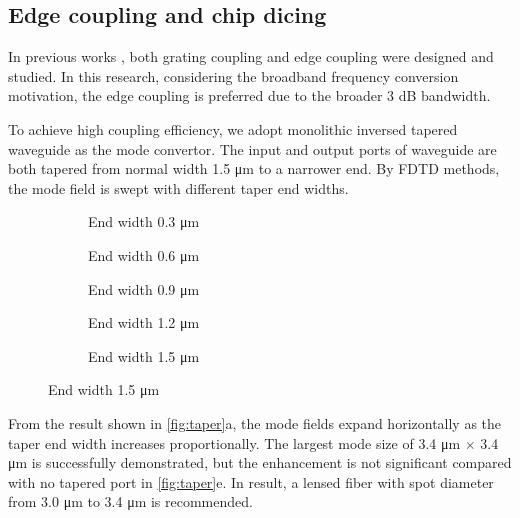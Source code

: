 \subsection{Edge coupling and chip dicing}

In previous works \cite{Sunada2018}, both grating coupling and edge coupling were designed and studied. In this research, considering the broadband frequency conversion motivation, the edge coupling is preferred due to the broader 3 dB bandwidth. 

To achieve high coupling efficiency, we adopt monolithic inversed tapered waveguide as the mode convertor. The input and output ports of waveguide are both tapered from normal width 1.5 \si{\um} to a narrower end. By FDTD methods, the mode field is swept with different taper end widths.

\begin{figure}
	\centering
	\begin{subfigure}[b]{0.33\textwidth}
		
		\caption{End width 0.3 \si{\um}}
	\end{subfigure}\hfill
	\begin{subfigure}[b]{0.33\textwidth}
		
		\caption{End width 0.6 \si{\um}}
	\end{subfigure}\hfill
	\begin{subfigure}[b]{0.33\textwidth}
		
		\caption{End width 0.9 \si{\um}}
	\end{subfigure}
	\vfill
	\begin{subfigure}[b]{0.33\textwidth}
		
		\caption{End width 1.2 \si{\um}}
	\end{subfigure}
	\begin{subfigure}[b]{0.33\textwidth}
		
		\caption{End width 1.5 \si{\um}}
	\end{subfigure}
\label{fig:taper}
\end{figure}

From the result shown in \autoref{fig:taper}a, the mode fields expand horizontally as the taper end width increases proportionally. The largest mode size of 3.4 \si{\um} $\times$ 3.4 \si{\um} is successfully demonstrated, but the enhancement is not significant compared with no tapered port in \autoref{fig:taper}e. In result, a lensed fiber with spot diameter from 3.0 \si{\um} to 3.4 \si{\um} is recommended. 

